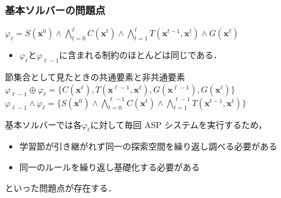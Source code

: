 \documentclass[dvipdfmx,11pt]{beamer}
\begin{document}
\begin{frame}\frametitle{基本ソルバーの問題点}

  \begin{block}{}
    \centering
    $
      \varphi_{\ell} = S(\bm{x}^0)
      \land \bigwedge_{t=0}^{\ell} C(\bm{x}^t) 
      \land \bigwedge_{t=1}^{\ell} T(\bm{x}^{t-1},\bm{x}^{t})
      \land G(\bm{x}^\ell)
    $
  \end{block}
  
  \begin{itemize}
    \item $\varphi_{\ell}$と$\varphi_{\ell-1}$に含まれる制約のほとんどは同じである．
  \end{itemize}

  \begin{block}{節集合として見たときの共通要素と非共通要素}
    \centering
    $
      \varphi_{\ell -1} \oplus \varphi_{\ell} = 
      \{C(\bm{x}^{\ell}), T(\bm{x}^{\ell -1}, 
      \bm{x}^{\ell}), G(\bm{x}^{\ell -1}), G(\bm{x}^{\ell})\}
    $ \\
    $
      \varphi_{\ell -1} \land \varphi_{\ell} =
      \{S(\bm{x}^0) \land \bigwedge_{t=0}^{\ell-1} C(\bm{x}^t)
      \land \bigwedge_{t=1}^{\ell-1} T(\bm{x}^{t-1},\bm{x}^{t})\}
    $
  \end{block}
  \bigskip

  基本ソルバーでは各$\varphi_{\ell}$に対して毎回 ASP システムを実行するため，
  \begin{itemize}
    \item 学習節が引き継がれず同一の探索空間を繰り返し調べる必要がある
    \item 同一のルールを繰り返し基礎化する必要がある
  \end{itemize}
  といった問題点が存在する．

\end{frame}
\end{document}
